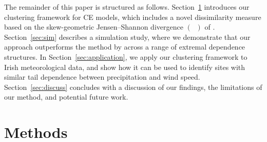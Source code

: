 \documentclass[
  12pt]{article}
\newcommand{\JSGa}{\mathop{\mathrm{JS}^{\mathrm{G}_{\lambda}}}\nolimits}
\begin{document}
The remainder of this paper is structured as follows.
Section~\ref{sec:method} introduces our clustering framework for CE models, which includes a novel dissimilarity measure based on the 
skew-geometric Jensen--Shannon divergence $\left(\JSGa{}\right)$ of \citet{Nielsen2019}. %
Section~\ref{sec:sim} describes a simulation study, where we demonstrate that our approach outperforms the method by \citet{Vignotto2021} across a range of extremal dependence structures. 
In Section~\ref{sec:application}, we apply our clustering framework to Irish meteorological data, and show how it can be used to identify sites with similar tail dependence between precipitation and wind speed.
Section~\ref{sec:discuss} concludes with a discussion of our findings, the limitations of our method, and potential future work.


\section{Methods}
\label{sec:method}

\end{document}
